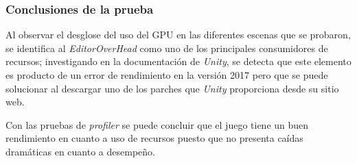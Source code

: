 \subsubsection{Conclusiones de la prueba}
Al observar el desglose del uso del GPU en las diferentes escenas que se
probaron, se identifica al \textit{EditorOverHead} como uno de los principales
consumidores de recursos; investigando en la documentación de \textit{Unity},
se detecta que este elemento es producto de un error de rendimiento en la
versión 2017 pero que se puede solucionar al descargar uno de los parches que
\textit{Unity} proporciona desde su sitio web.
\\
\par
Con las pruebas de \textit{profiler} se puede concluir que el juego tiene un buen
rendimiento en cuanto a uso de recursos puesto que no presenta caídas
dramáticas en cuanto a desempeño.